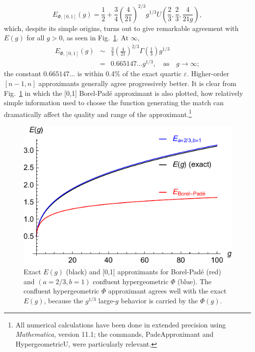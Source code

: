 \documentclass[12pt]{iopart}
\begin{document}
%
\begin{equation}
	\label{eq:x4blp}
	   E_{\Phi,[0,1]}(g) = \frac{1}{2} + 
	\frac{3}{4} 
	\left(   \frac {4} {21}   \right)^{2/3}
	g^{1/3}
	U \left( \frac{2}{3},\frac{2}{3}, \frac{4}{21g} \right),
\end{equation}
%
which, despite its simple origins, turns out to give remarkable agreement with $E(g)$ for all $g>0$,
as seen in Fig.~\ref{fig:1}. At $\infty$,  
%
\begin{eqnarray}
   E_{\Phi,[0,1]}(g) & \sim &
	\frac{3}{4} 
	\left(   \frac {4} {21}   \right)^{2/3}
	\Gamma\left( \frac{1}{3}\right)  
		g^{1/3}
\\
	& = &  0.665147\ldots g^{1/3},\quad\mathrm{as }\quad g\rightarrow \infty ;
\end{eqnarray}
%
the constant $0.665147\ldots$ is within 0.4\% of the exact quartic $\varepsilon$.
Higher-order $[n-1,n]$
approximants generally agree progressively better. It is clear from Fig.~\ref{fig:1} in which the [0,1] Borel-Pad\'e approximant is also plotted, 
how relatively simple information used to choose the function generating the match
can dramatically affect the quality and range of the approximant.\footnote{All numerical calculations have been done
in extended precision using {\em Mathematica}, version 11.1; the commands, PadeApproximant and HypergeometricU, were particularly relevant.}

\begin{figure}[htb]
	\begin{center}
		\includegraphics[scale=0.95]{"figure1"}
	\end{center}
	\caption{Exact $E(g)$ (black) and [0,1] approximants for Borel-Pad\'e (red) and
	              $(a=2/3,b=1)$ confluent hypergeometric $\Phi$ (blue). The confluent hypergeometric $\Phi$
	              approximant agrees well with the exact $E(g)$, because the $g^{1/3}$ large-$g$
	              behavior is carried by the $\Phi(g)$.}
	\label{fig:1}
\end{figure}
\end{document}
